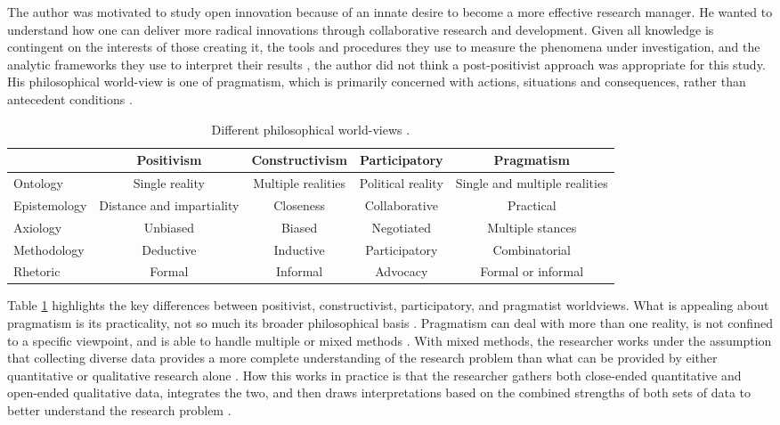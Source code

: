 The author was motivated to study open innovation because of an innate desire to become a more effective research manager. He wanted to understand how one can deliver more radical innovations through collaborative research and development. Given all knowledge is contingent on the interests of those creating it, the tools and procedures they use to measure the phenomena under investigation, and the analytic frameworks they use to interpret their results \citep{monahan2010benefits}, the author did not think a post-positivist approach was appropriate for this study. His philosophical world-view is one of pragmatism, which is primarily concerned with actions, situations and consequences, rather than antecedent conditions \citep{creswell2013research}. \medskip

\begin{table}[]
    \centering
    \caption{Different philosophical world-views \citep{creswell2011designing}.}
    \label{tab:worldview}
    \begin{adjustbox}{width = \textwidth}
        \begin{tabular}{@{}l | cccc@{}}
            \toprule
             & Positivism & Constructivism & Participatory & Pragmatism \\ \midrule
            Ontology & Single reality & Multiple realities & Political reality & Single and multiple realities \\
            Epistemology & Distance and impartiality & Closeness & Collaborative & Practical \\
            Axiology & Unbiased & Biased & Negotiated & Multiple stances \\
            Methodology & Deductive & Inductive & Participatory & Combinatorial \\
            Rhetoric & Formal & Informal & Advocacy & Formal or informal \\ \bottomrule
        \end{tabular}
    \end{adjustbox}
\end{table}

Table \ref{tab:worldview} highlights the key differences between positivist, constructivist, participatory, and pragmatist worldviews. What is appealing about pragmatism is its practicality, not so much its broader philosophical basis \citep{morgan2014pragmatism}. Pragmatism can deal with more than one reality, is not confined to a specific viewpoint, and is able to handle multiple or mixed methods \citep{johnson2004mixed}. With mixed methods, the researcher works under the assumption that collecting diverse data provides a more complete understanding of the research problem than what can be provided by either quantitative or qualitative research alone \citep{creswell2013research}. How this works in practice is that the researcher gathers both close-ended quantitative and open-ended qualitative data, integrates the two, and then draws interpretations based on the combined strengths of both sets of data to better understand the research problem \citep{creswell2011designing}. \medskip

